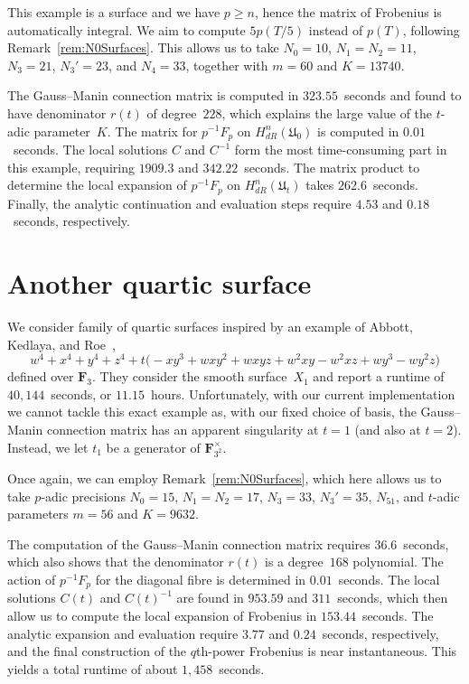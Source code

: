 This example is a surface and we have $p \geq n$, hence the matrix of Frobenius 
is automatically integral.  We aim to compute $5 p(T/5)$ instead of $p(T)$, 
following Remark~\ref{rem:N0Surfaces}.  This allows us to take $N_0 = 10$, 
$N_1 = N_2 = 11$, $N_3 = 21$, $N_3' = 23$, and $N_4 = 33$, together with 
$m = 60$ and $K = 13740$.

The Gauss--Manin connection matrix is computed in $323.55$~seconds and found 
to have denominator $r(t)$ of degree~$228$, which explains the large value 
of the $t$-adic parameter~$K$.  The matrix for $p^{-1} F_p$ on 
$H_{dR}^{n}(\mathfrak{U}_0)$ is computed in $0.01$~seconds.  The local 
solutions $C$ and $C^{-1}$ form the most time-consuming part in this example, 
requiring $1909.3$ and $342.22$~seconds.  The matrix product to determine the 
local expansion of $p^{-1} F_p$ on $H_{dR}^{n}(\mathfrak{U}_t)$ takes 
$262.6$~seconds. Finally, the analytic continuation and evaluation steps 
require $4.53$ and $0.18$~seconds, respectively.

\section{Another quartic surface}

We consider family of quartic surfaces inspired by an example of 
Abbott, Kedlaya, and Roe~\citep[Example~4.2.1]{AbbottKedlayaRoe2006}, 
\begin{equation*}
w^4 + x^4 + y^4 + z^4 + t \bigl(
    -x y^3 + w x y^2 + w x y z  + w^2 x y - w^2 x z + w y^3 - w y^2 z \bigr) 
\end{equation*}
defined over $\mathbf{F}_3$.  They consider the smooth surface~$X_1$ 
and report a runtime of $40,144$~seconds, or $11.15$~hours.  Unfortunately, 
with our current implementation we cannot tackle this exact example 
as, with our fixed choice of basis, the Gauss--Manin connection matrix 
has an apparent singularity at $t = 1$ (and also at $t = 2$).  Instead, 
we let $t_1$ be a generator of $\mathbf{F}_{3^2}^{\times}$.

Once again, we can employ Remark~\ref{rem:N0Surfaces}, which here allows 
us to take $p$-adic precisions $N_0 = 15$, $N_1 = N_2 = 17$, $N_3 = 33$, 
$N_3' = 35$, $N_51$, and $t$-adic parameters $m = 56$ and $K = 9632$.

The computation of the Gauss--Manin connection matrix requires $36.6$~seconds, 
which also shows that the denominator $r(t)$ is a degree~$168$ polynomial.
The action of $p^{-1} F_p$ for the diagonal fibre is determined in 
$0.01$~seconds.  The local solutions $C(t)$ and $C(t)^{-1}$ are found in 
$953.59$ and $311$~seconds, which then allow us to compute the local expansion 
of Frobenius in $153.44$~seconds.  The analytic expansion and 
evaluation require $3.77$ and $0.24$~seconds, respectively, and the final 
construction of the $q$th-power Frobenius is near instantaneous. 
This yields a total runtime of about $1,458$~seconds.

